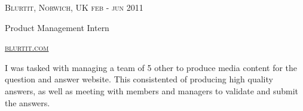 {
  \textsc{\small{Blurtit, Norwich, UK
    \hfill
      {\raggedleft
        feb - jun 2011
      } \\
    }
  }
  {\raggedright\large {
    Product Management Intern
  } \\}

  \textsc{\small\href{http://www.blurtit.com}{blurtit.com}}

  \normalsize{\raggedright
    I was tasked with managing a team of 5 other to produce media content for the question and answer website. This consistented of producing high quality answers, as well as meeting with members and managers to validate and submit the answers. 
  }
}
